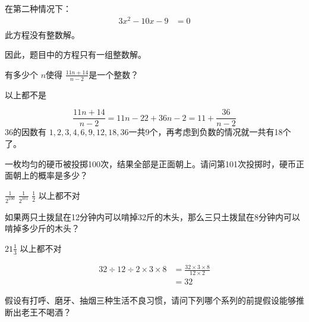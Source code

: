 \begin{questions}
\begin{solution}
		在第二种情况下：
		\begin{align*}
			3x^2 - 10x - 9 & = 0 \\
		\end{align*}
		此方程没有整数解。

		因此，题目中的方程只有一组整数解。
	\end{solution}

	\question 有多少个 \( n \)使得 \( \displaystyle\frac{11n+14}{n-2} \)是一个整数？

	\begin{oneparchoices}
		    \choice 以上都不是
	\end{oneparchoices}

	\begin{solution}
		\begin{equation*}
			\frac{11n + 14}{n-2} = {11n - 22 + 36}{n-2} = 11 + \frac{36}{n-2}
		\end{equation*}
		\( 36 \)的因数有 \( 1,2,3,4,6,9,12,18,36 \)一共9个，再考虑到负数的情况就一共有18个了。
	\end{solution}

	\question 一枚均匀的硬币被投掷100次，结果全部是正面朝上。请问第101次投掷时，硬币正面朝上的概率是多少？

	\begin{oneparchoices}
		 \choice \( \frac{1}{2^{100}} \) \choice \( \frac{1}{2^{101}} \) \CorrectChoice \( \frac{1}{2} \) \choice 以上都不对
	\end{oneparchoices}

	\question  如果两只土拨鼠在12分钟内可以啃掉32斤的木头，那么三只土拨鼠在8分钟内可以啃掉多少斤的木头？
	\begin{oneparchoices}
		\choice \( 21\frac13 \)    \choice 以上都不对
	\end{oneparchoices}

	\begin{solution}
		\begin{align*}
			32 \div 12 \div 2 \times 3 \times 8 & = \frac{32 \times 3 \times 8}{12 \times 2} \\
			                                    & = 32
		\end{align*}
	\end{solution}

	\question 假设有打呼、磨牙、抽烟三种生活不良习惯，请问下列哪个系列的前提假设能够推断出老王不喝酒？


\end{questions}
